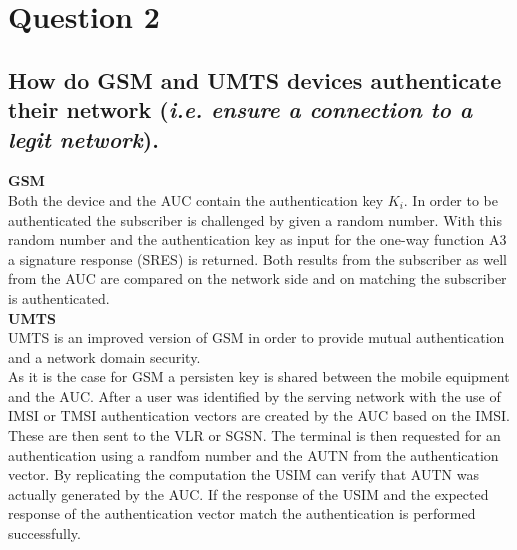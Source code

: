 \documentclass{report}
\begin{document}
	\section{Question 2}
	\startsection
		\renewcommand{\thesubsection}{\thesection.\Alph{subsection}}
		\subsection{How do GSM and UMTS devices authenticate their network (\textit{i.e. ensure a connection to a legit network}).}
		\startsubsection
			\textbf{GSM} \\
			Both the device and the AUC contain the authentication key $K_i$. In order to be authenticated the subscriber is challenged by given a random number. With this random number and the authentication key as input for the one-way function A3 a signature response (SRES) is returned. Both results from the subscriber as well from the AUC are compared on the network side and on matching the subscriber is authenticated. \\
			\textbf{UMTS} \\
			UMTS is an improved version of GSM in order to provide mutual authentication and a  network domain security. \\
			As it is the case for GSM a persisten key is shared between the mobile equipment and the AUC. After a user was identified by the serving network with the use of IMSI or TMSI authentication vectors are created by the AUC based on the IMSI. These are then sent to the VLR or SGSN. The terminal is then requested for an authentication using a randfom number and the AUTN from the authentication vector. By replicating the computation the USIM can verify that AUTN was actually generated by the AUC. If the response of the USIM and the expected response of the authentication vector match the authentication is performed successfully.
		\closesection
	\closesection
\end{document}
